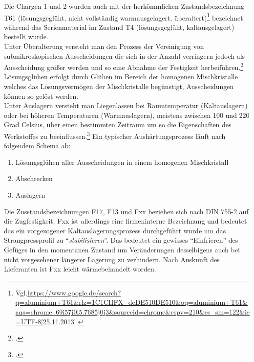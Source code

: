 \documentclass[12pt,a4paper,parskip]{scrartcl}
\begin{document}
{\begin{table}[htbp]
\begin{tabular}{lllll}
\end{tabular}
\end{table}


 Die Chargen 1 und 2 wurden auch mit der herkömmlichen Zustandsbezeichnung T61 (lösungsgeglüht, nicht vollständig warmausgelagert, überaltert)\footnote{Vgl.\url{https://www.google.de/search?q=aluminium+T61&rlz=1C1CHFX_deDE510DE510&oq=aluminium+T61&aqs=chrome..69i57j0l5.7685j0j3&sourceid=chrome&espv=210&es_sm=122&ie=UTF-8}[25.11.2013].} bezeichnet während das Serienmaterial im Zustand T4 (lösungsgeglüht, kaltausgelagert) bestellt wurde. \\
 Unter Überalterung versteht man  den Prozess der Vereinigung von  submikroskopischen Ausscheidungen die sich  in der Anzahl verringern jedoch als Ausscheidung größer werden und so eine Abnahme der Festigkeit herbeiführen.\footcite[Vgl.][52]{wki}\\
  Lösungsglühen erfolgt durch Glühen im Bereich der homogenen Mischkristalle welches das   Lösungsvermögen der Mischkristalle begünstigt, Ausscheidungen können so gelöst werden.\\
   Unter Auslagern versteht man Liegenlassen bei Raumtemperatur (Kaltauslagern) oder bei  höheren Temperaturen (Warmauslagern), meistens zwischen 100 und 220 Grad Celsius, über einen bestimmten Zeitraum um so die Eigenschaften des Werkstoffes zu beeinflussen.\footcite[Vgl.][213]{wk}
Ein typischer Aushärtungsprozess läuft nach folgendem Schema ab:

\begin{enumerate}
 \item Lösungsglühen aller Ausscheidungen in einem homogenen Mischkristall 
 \item Abschrecken
 \item Auslagern 
 \end{enumerate}
 
   
 
 

Die Zusstandsbezeichnungen F17, F13 und Fxx beziehen sich nach DIN 755-2 auf die Zugfestigkeit. Fxx ist allerdings eine firmeninterne Bezeichnung und bedeutet das ein  vorgezogener Kaltauslagerungsprozess durchgeführt wurde um das Strangpressprofil zu "`\emph{stabilisieren}"'. Das bedeutet ein gewisses "`Einfrieren"' des Gefüges in den momentanen Zustand um Veränderungen desselbigens auch bei nicht vorgesehener längerer Lagerung zu verhindern. Nach Auskunft des Lieferanten ist Fxx leicht wärmebehandelt worden.


}
\end{document}
